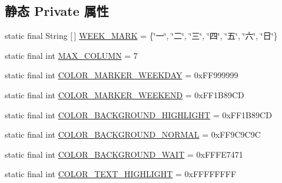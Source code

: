 \subsection*{静态 Private 属性}
\begin{DoxyCompactItemize}
\item 
static final String \mbox{[}$\,$\mbox{]} \mbox{\hyperlink{classcom_1_1example_1_1akisame__lin_1_1love__air2_1_1_bean_1_1_sign_view_ac9b1386039dba532109a0b9ce921a60f}{W\+E\+E\+K\+\_\+\+M\+A\+RK}} = \{\char`\"{}一\char`\"{}, \char`\"{}二\char`\"{}, \char`\"{}三\char`\"{}, \char`\"{}四\char`\"{}, \char`\"{}五\char`\"{}, \char`\"{}六\char`\"{}, \char`\"{}日\char`\"{}\}
\item 
static final int \mbox{\hyperlink{classcom_1_1example_1_1akisame__lin_1_1love__air2_1_1_bean_1_1_sign_view_acffd60d6791040082baf6542f4ee6509}{M\+A\+X\+\_\+\+C\+O\+L\+U\+MN}} = 7
\item 
static final int \mbox{\hyperlink{classcom_1_1example_1_1akisame__lin_1_1love__air2_1_1_bean_1_1_sign_view_a0faaec2a675b42d24c1c7468a35404be}{C\+O\+L\+O\+R\+\_\+\+M\+A\+R\+K\+E\+R\+\_\+\+W\+E\+E\+K\+D\+AY}} = 0x\+F\+F999999
\item 
static final int \mbox{\hyperlink{classcom_1_1example_1_1akisame__lin_1_1love__air2_1_1_bean_1_1_sign_view_a3953440d6169f17863d09fc92e608878}{C\+O\+L\+O\+R\+\_\+\+M\+A\+R\+K\+E\+R\+\_\+\+W\+E\+E\+K\+E\+ND}} = 0x\+F\+F1\+B89\+CD
\item 
static final int \mbox{\hyperlink{classcom_1_1example_1_1akisame__lin_1_1love__air2_1_1_bean_1_1_sign_view_a9e31bcad3ffb14d58d1ba8e29ad04ffe}{C\+O\+L\+O\+R\+\_\+\+B\+A\+C\+K\+G\+R\+O\+U\+N\+D\+\_\+\+H\+I\+G\+H\+L\+I\+G\+HT}} = 0x\+F\+F1\+B89\+CD
\item 
static final int \mbox{\hyperlink{classcom_1_1example_1_1akisame__lin_1_1love__air2_1_1_bean_1_1_sign_view_a524ecd11efa3f8105ebffe9beb8f0852}{C\+O\+L\+O\+R\+\_\+\+B\+A\+C\+K\+G\+R\+O\+U\+N\+D\+\_\+\+N\+O\+R\+M\+AL}} = 0x\+F\+F9\+C9\+C9C
\item 
static final int \mbox{\hyperlink{classcom_1_1example_1_1akisame__lin_1_1love__air2_1_1_bean_1_1_sign_view_a19da1b34f27405f210a2fd3a485070d5}{C\+O\+L\+O\+R\+\_\+\+B\+A\+C\+K\+G\+R\+O\+U\+N\+D\+\_\+\+W\+A\+IT}} = 0x\+F\+F\+F\+E7471
\item 
static final int \mbox{\hyperlink{classcom_1_1example_1_1akisame__lin_1_1love__air2_1_1_bean_1_1_sign_view_a3ec82e9cb520052c491cea401152fc42}{C\+O\+L\+O\+R\+\_\+\+T\+E\+X\+T\+\_\+\+H\+I\+G\+H\+L\+I\+G\+HT}} = 0x\+F\+F\+F\+F\+F\+F\+FF
\item 

\end{DoxyCompactItemize}
